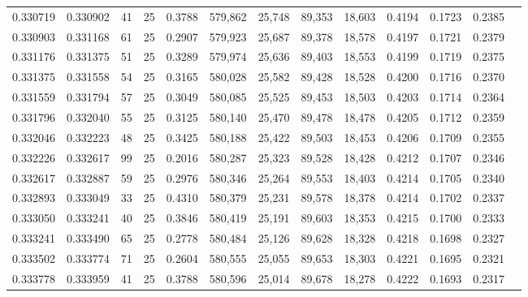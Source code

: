 \begin{tabular}{rrrrrrrrrrrrr}
0.330719 & 0.330902 &    41 &  25 &                                     0.3788 & 579,862 &  25,748 &  89,353 &  18,603 & 0.4194 & 0.1723 & 0.2385 \\
0.330903 & 0.331168 &    61 &  25 &                                     0.2907 & 579,923 &  25,687 &  89,378 &  18,578 & 0.4197 & 0.1721 & 0.2379 \\
0.331176 & 0.331375 &    51 &  25 &                                     0.3289 & 579,974 &  25,636 &  89,403 &  18,553 & 0.4199 & 0.1719 & 0.2375 \\
0.331375 & 0.331558 &    54 &  25 &                                     0.3165 & 580,028 &  25,582 &  89,428 &  18,528 & 0.4200 & 0.1716 & 0.2370 \\
0.331559 & 0.331794 &    57 &  25 &                                     0.3049 & 580,085 &  25,525 &  89,453 &  18,503 & 0.4203 & 0.1714 & 0.2364 \\
0.331796 & 0.332040 &    55 &  25 &                                     0.3125 & 580,140 &  25,470 &  89,478 &  18,478 & 0.4205 & 0.1712 & 0.2359 \\
0.332046 & 0.332223 &    48 &  25 &                                     0.3425 & 580,188 &  25,422 &  89,503 &  18,453 & 0.4206 & 0.1709 & 0.2355 \\
0.332226 & 0.332617 &    99 &  25 &                                     0.2016 & 580,287 &  25,323 &  89,528 &  18,428 & 0.4212 & 0.1707 & 0.2346 \\
0.332617 & 0.332887 &    59 &  25 &                                     0.2976 & 580,346 &  25,264 &  89,553 &  18,403 & 0.4214 & 0.1705 & 0.2340 \\
0.332893 & 0.333049 &    33 &  25 &                                     0.4310 & 580,379 &  25,231 &  89,578 &  18,378 & 0.4214 & 0.1702 & 0.2337 \\
0.333050 & 0.333241 &    40 &  25 &                                     0.3846 & 580,419 &  25,191 &  89,603 &  18,353 & 0.4215 & 0.1700 & 0.2333 \\
0.333241 & 0.333490 &    65 &  25 &                                     0.2778 & 580,484 &  25,126 &  89,628 &  18,328 & 0.4218 & 0.1698 & 0.2327 \\
0.333502 & 0.333774 &    71 &  25 &                                     0.2604 & 580,555 &  25,055 &  89,653 &  18,303 & 0.4221 & 0.1695 & 0.2321 \\
0.333778 & 0.333959 &    41 &  25 &                                     0.3788 & 580,596 &  25,014 &  89,678 &  18,278 & 0.4222 & 0.1693 & 0.2317 \\

\end{tabular}
